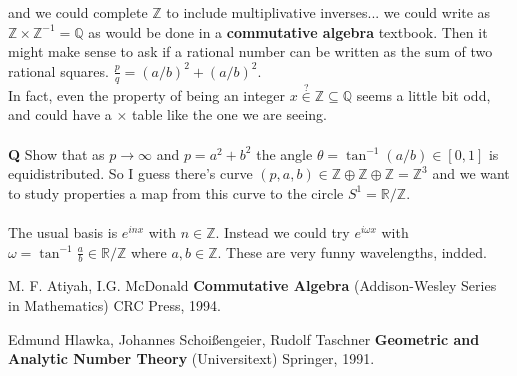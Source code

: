 \documentclass[12pt]{article}
\begin{document}
and we could complete $\mathbb{Z}$ to include multiplivative inverses... we could write as $\mathbb{Z} \times \mathbb{Z}^{-1} = \mathbb{Q}$ as would be done in a \textbf{commutative algebra} textbook.  Then it might make sense to ask if a rational number can be written as the sum of two rational squares. $\frac{p}{q} = (a/b)^2 + (a/b)^2$. \\
In fact, even the property of being an integer $x \stackrel{?}{\in} \mathbb{Z} \subseteq \mathbb{Q}$ seems a little bit odd, and could have a $\times$ table like the one we are seeing. \\ \\
\textbf{Q} Show that as $p \to \infty$ and $p = a^2 + b^2$ the angle $\theta = \tan^{-1}(a/b) \in [0,1]$ is equidistributed.  So I guess there's curve $(p,a,b) \in \mathbb{Z} \oplus \mathbb{Z} \oplus \mathbb{Z} = \mathbb{Z}^3$ and we want to study properties a map from this curve to the circle $S^1 = \mathbb{R}/\mathbb{Z}$. \\ \\
The usual basis is $e^{inx}$ with $n \in \mathbb{Z}$.  Instead we could try $e^{i\omega x}$ with $\omega = \tan^{-1} \frac{a}{b} \in \mathbb{R}/\mathbb{Z}$ where $a,b \in \mathbb{Z}$.  These are very funny wavelengths, indded.
 
\vfill

\begin{thebibliography}{}

\item M. F. Atiyah, I.G. McDonald \textbf{Commutative Algebra} (Addison-Wesley Series in Mathematics) CRC Press, 1994.

\item Edmund Hlawka, Johannes Schoi\ss{}engeier, Rudolf Taschner  \textbf{Geometric and Analytic Number Theory} (Universitext) Springer, 1991. 

\end{thebibliography}
\end{document}
